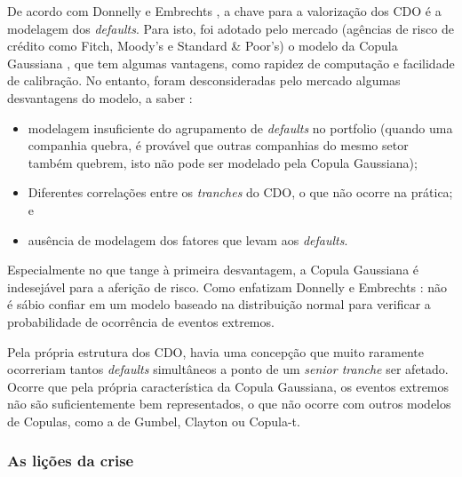 \documentclass[
	12pt,				%
	oneside,			%
	a4paper,			%
	chapter=TITLE,		%
	section=TITLE,		%
	english,			%
	brazil				%
	]{abntex2}
\begin{document}
\begin{refsection}
De acordo com Donnelly e Embrechts \autocite*[7]{devil}, a chave para a valorização dos
\gls{CDO} é a modelagem dos \emph{defaults}. Para isto, foi adotado pelo mercado
(agências de risco de crédito como Fitch, Moody's e Standard \& Poor's) o modelo
da Copula Gaussiana \autocite[14]{devil}, que tem algumas vantagens, como rapidez de
computação e facilidade de calibração. No entanto, foram desconsideradas pelo
mercado algumas desvantagens do modelo, a saber \autocite[15]{devil}:
\begin{itemize}
\tightlist
\item
  modelagem insuficiente do agrupamento de \emph{defaults} no portfolio (quando uma
  companhia quebra, é provável que outras companhias do mesmo setor também quebrem,
  isto não pode ser modelado pela Copula Gaussiana);
\item
  Diferentes correlações entre os \emph{tranches} do CDO, o que não ocorre na
  prática; e
\item
  ausência de modelagem dos fatores que levam aos \emph{defaults}.
\end{itemize}
Especialmente no que tange à primeira desvantagem, a Copula Gaussiana é
indesejável para a aferição de risco. Como enfatizam Donnelly e Embrechts
\autocite*[16]{devil}: não é sábio confiar em um modelo baseado na distribuição normal
para verificar a probabilidade de ocorrência de eventos extremos.

Pela própria estrutura dos \gls{CDO}, havia uma concepção que muito raramente
ocorreriam tantos \emph{defaults} simultâneos a ponto de um \emph{senior tranche} ser
afetado. Ocorre que pela própria característica da Copula Gaussiana, os eventos
extremos não são suficientemente bem representados, o que não ocorre com outros
modelos de Copulas, como a de Gumbel, Clayton ou Copula-t.

\hypertarget{as-liuxe7uxf5es-da-crise}{%
\subsubsection{As lições da crise}\label{as-liuxe7uxf5es-da-crise}}


\end{refsection}
\end{document}
